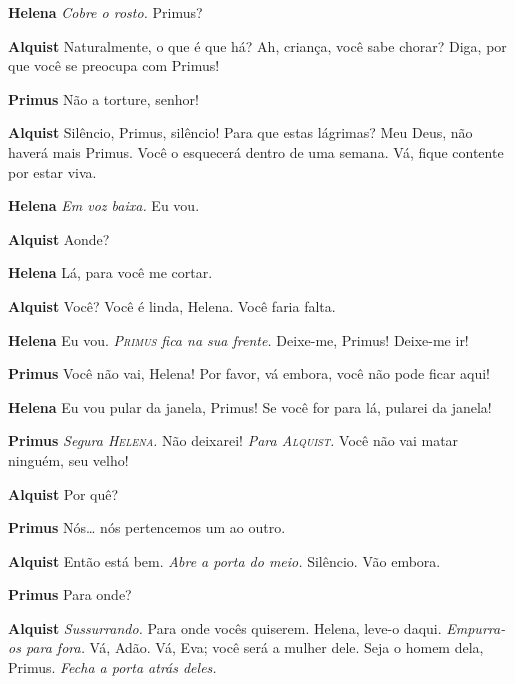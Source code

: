 \textbf{Helena} \emph{Cobre o rosto.} Primus?

\textbf{Alquist} Naturalmente, o que é que há? Ah, criança, você sabe chorar? Diga,
por que você se preocupa com Primus!

\textbf{Primus} Não a torture, senhor!

\textbf{Alquist} Silêncio, Primus, silêncio! Para que estas lágrimas? Meu Deus,
não haverá mais Primus. Você o esquecerá dentro de uma semana. Vá, fique
contente por estar viva.

\textbf{Helena} \emph{Em voz baixa.} Eu vou.

\textbf{Alquist} Aonde?

\textbf{Helena} Lá, para você me cortar.

\textbf{Alquist} Você? Você é linda, Helena. Você faria falta.

\textbf{Helena} Eu vou. \emph{\textsc{Primus} fica na sua frente.} Deixe-me, Primus! Deixe-me ir!

\textbf{Primus} Você não vai, Helena! Por favor, vá embora, você não pode ficar aqui!

\textbf{Helena} Eu vou pular da janela, Primus! Se você for para lá, pularei da janela!

\textbf{Primus} \emph{Segura \textsc{Helena}.} Não deixarei! \emph{Para \textsc{Alquist}.} Você não
vai matar ninguém, seu velho!

\textbf{Alquist} Por quê?

\textbf{Primus} Nós\ldots{} nós pertencemos um ao outro.

\textbf{Alquist} Então está bem. \emph{Abre a porta do meio.} Silêncio. Vão embora.

\textbf{Primus} Para onde?

\textbf{Alquist} \emph{Sussurrando.} Para onde vocês quiserem. Helena, leve-o daqui.
\emph{Empurra-os para fora.} Vá, Adão. Vá, Eva; você será a mulher dele. Seja o homem dela,
Primus.
\emph{Fecha a porta atrás deles.}

